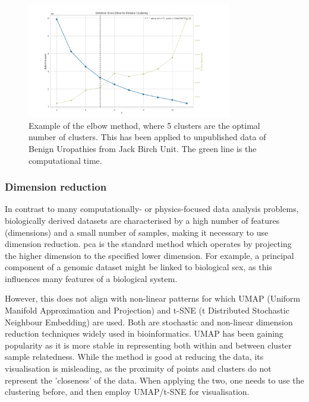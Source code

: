 \begin{figure}[!htb]
  \centering\includegraphics[width=0.8\textwidth,height=0.8\textheight,keepaspectratio]{Sections/Lit_review/Resources/elbow_method.png}
    \caption{Example of the elbow method, where 5 clusters are the optimal number of clusters. This has been applied to unpublished data of Benign Uropathies from Jack Birch Unit. The green line is the computational time. }
    \label{fig:elbow_method}
\end{figure}
\FloatBarrier


\subsubsection{Dimension reduction} \label{s:lit:dim_red}

In contrast to many computationally- or physics-focused data analysis problems, biologically derived datasets are characterised by a high number of features (dimensions) and a small number of samples, making it necessary to use dimension reduction. \acrfull{pca} is the standard method which operates by projecting the higher dimension to the specified lower dimension. For example, a principal component of a genomic dataset might be linked to biological sex, as this influences many features of a biological system.

However, this does not align with non-linear patterns for which UMAP (Uniform Manifold Approximation and Projection) and t-SNE (t Distributed Stochastic Neighbour Embedding) are used. Both are stochastic and non-linear dimension reduction techniques widely used in bioinformatics. UMAP has been gaining popularity as it is more stable in representing both within and between cluster sample relatedness. While the method is good at reducing the data, its visualisation is misleading, as the proximity of points and clusters do not represent the 'closeness' of the data. When applying the two, one needs to use the clustering before, and then employ UMAP/t-SNE for visualisation.

